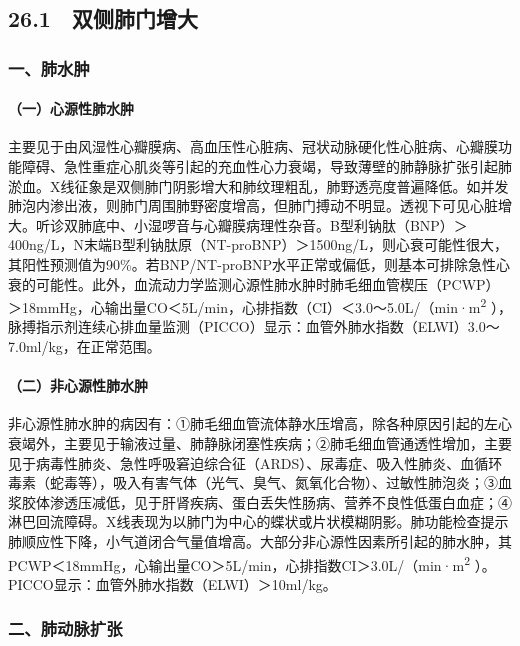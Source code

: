 \subsection{26.1　双侧肺门增大}

\subsubsection{一、肺水肿}

\paragraph{（一）心源性肺水肿}

主要见于由风湿性心瓣膜病、高血压性心脏病、冠状动脉硬化性心脏病、心瓣膜功能障碍、急性重症心肌炎等引起的充血性心力衰竭，导致薄壁的肺静脉扩张引起肺淤血。X线征象是双侧肺门阴影增大和肺纹理粗乱，肺野透亮度普遍降低。如并发肺泡内渗出液，则肺门周围肺野密度增高，但肺门搏动不明显。透视下可见心脏增大。听诊双肺底中、小湿啰音与心瓣膜病理性杂音。B型利钠肽（BNP）＞400ng/L，N末端B型利钠肽原（NT-proBNP）＞1500ng/L，则心衰可能性很大，其阳性预测值为90\%。若BNP/NT-proBNP水平正常或偏低，则基本可排除急性心衰的可能性。此外，血流动力学监测心源性肺水肿时肺毛细血管楔压（PCWP）＞18mmHg，心输出量CO＜5L/min，心排指数（CI）＜3.0～5.0L/（min·m\textsuperscript{2}
），脉搏指示剂连续心排血量监测（PICCO）显示：血管外肺水指数（ELWI）3.0～7.0ml/kg，在正常范围。

\paragraph{（二）非心源性肺水肿}

非心源性肺水肿的病因有：①肺毛细血管流体静水压增高，除各种原因引起的左心衰竭外，主要见于输液过量、肺静脉闭塞性疾病；②肺毛细血管通透性增加，主要见于病毒性肺炎、急性呼吸窘迫综合征（ARDS）、尿毒症、吸入性肺炎、血循环毒素（蛇毒等），吸入有害气体（光气、臭气、氮氧化合物）、过敏性肺泡炎；③血浆胶体渗透压减低，见于肝肾疾病、蛋白丢失性肠病、营养不良性低蛋白血症；④淋巴回流障碍。X线表现为以肺门为中心的蝶状或片状模糊阴影。肺功能检查提示肺顺应性下降，小气道闭合气量值增高。大部分非心源性因素所引起的肺水肿，其PCWP＜18mmHg，心输出量CO＞5L/min，心排指数CI＞3.0L/（min·m\textsuperscript{2}
）。PICCO显示：血管外肺水指数（ELWI）＞10ml/kg。

\subsubsection{二、肺动脉扩张}


